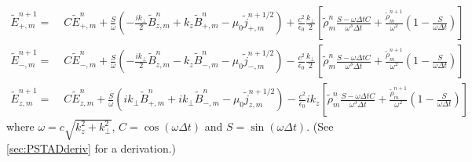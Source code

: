 \documentclass[a4paper]{article}   	%
\newcommand{\tB}[2]{\tilde{B}_{#1,m}^{#2}}
\newcommand{\tE}[2]{\tilde{E}_{#1,m}^{#2}}
\newcommand{\tj}[2]{\tilde{j}_{#1,m}^{#2}}
\newcommand{\trho}[1]{\tilde{\rho}_{m}^{#1}}
\begin{document}
\begin{align*}
\tE{+}{n+1} = \; & C \tE{+}{n} + 
\frac{S}{\omega}\left(-\frac{ik_\perp }{2} \tB{z}{n} + k_z\tB{+}{n}
- \mu_0 \tj{+}{n+1/2} \right) + \frac{c^2}{\epsilon_0}
\frac{k_\perp}{2}\left[ \trho{n}\frac{S-\omega\Delta t
  C}{\omega^3\Delta t} + \frac{\trho{n+1}}{\omega^2}\left(
  1 - \frac{S}{\omega\Delta t}\right) \right]  & \\
\tE{-}{n+1} =\; & C \tE{-}{n} +
\frac{S}{\omega}\left(- \frac{ik_\perp }{2} \tB{z}{n} - k_z\tB{-}{n}
- \mu_0 \tj{-}{n+1/2} \right) - \frac{c^2}{\epsilon_0}
\frac{k_\perp}{2}\left[ \trho{n}\frac{S-\omega\Delta t
  C}{\omega^3\Delta t} + \frac{\trho{n+1}}{\omega^2}\left(
  1 - \frac{S}{\omega\Delta t}\right) \right]  &\\
\tE{z}{n+1} =\; & C \tE{z}{n} + 
\frac{S}{\omega}\left(ik_\perp \tB{+}{n} + ik_\perp \tB{-}{n}
- \mu_0 \tj{z}{n+1/2} \right) - \frac{c^2}{\epsilon_0}
ik_z\left[ \trho{n}\frac{S-\omega\Delta t
  C}{\omega^3\Delta t} + \frac{\trho{n+1}}{\omega^2}\left(
  1 - \frac{S}{\omega\Delta t}\right) \right]  &
\end{align*}
where $\omega= c\sqrt{k_z^2 + k_\perp^2}$, $C = \cos(\omega \Delta t)$ and $S = \sin(\omega \Delta t) $. (See \cref{sec:PSTADderiv} for a derivation.)

\newpage
\appendix





\end{document}
